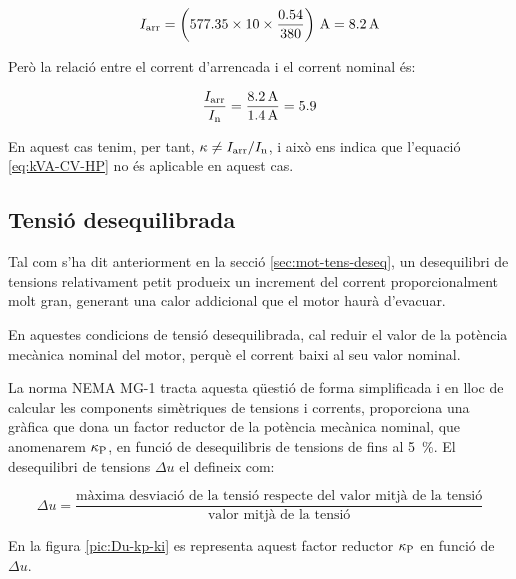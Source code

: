 \begin{exemple}[\MotorArrencNEMA{}]
    \[
      I\ped{arr} = \left(\num{577,35} \times 10 \times \frac{\num{0,54}}{380}\right) \,\unit{A} = \qty{8,2}{A}
    \]

    Però la relació entre el corrent d'arrencada i el corrent nominal és:
    
    \[
        \frac{I_\mathrm{arr}}{I_\mathrm{n}} = \frac{\qty{8,2}{A}}{\qty{1,4}{A}} = \num{5,9}
    \]

    En aquest cas tenim, per tant, $\kappa \neq I_\mathrm{arr}/I_\mathrm{n}$, i això ens indica que l'equació \eqref{eq:kVA-CV-HP} no és aplicable en aquest cas.
\end{exemple}

\subsection{Tensió desequilibrada}\label{sec:NEMA-U-deseq}

Tal com s'ha dit anteriorment en la secció \ref{sec:mot-tens-deseq}, un desequilibri de tensions relativament petit produeix un increment del corrent proporcionalment molt gran, generant una  calor addicional que el motor haurà d'evacuar.

En aquestes condicions de tensió desequilibrada, cal reduir el valor de la potència mecànica nominal del motor, perquè el corrent baixi al seu valor nominal.

La norma NEMA MG-1 tracta aquesta qüestió de forma simplificada i en lloc de calcular les components simètriques de tensions i corrents, proporciona una gràfica que dona un factor reductor de la potència mecànica nominal, que anomenarem $\kappa_\mathrm{P}$, en funció de desequilibris de tensions de fins al \qty{5}{\%}. El desequilibri de tensions $\Delta u$ el defineix com:

\begin{equation}
    \Delta u = \frac{\text{màxima desviació de la tensió respecte del valor mitjà de la tensió}}{\text{valor mitjà de la tensió}}
\end{equation}

En la figura \vref{pic:Du-kp-ki} es representa aquest factor reductor $\kappa_\mathrm{P}$ en funció de $\Delta u$.

\begin{center}
    
    \label{pic:Du-kp-ki}
\end{center}




